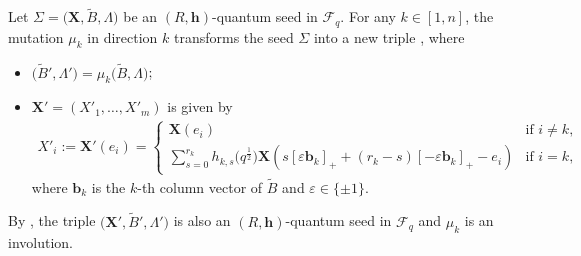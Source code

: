 \documentclass[pdftex]{sigma}
\numberwithin{equation}{section}
\begin{document}
 \begin{Definition}\label{mutation_of_generalzied_seed}
Let $\Sigma=\bigl(\mathbf{X},\tilde{B},\Lambda\bigr)$ be an $(R,\mathbf{h})$-quantum seed in $\mathcal{F}_q$. For any $k\in[1,n]$, the mutation $\mu_k$ in direction $k$ transforms the seed $\Sigma$ into a new triple , where
\begin{itemize}\itemsep=0pt
\item[(1)] $\bigl(\tilde{B}', \Lambda'\bigr)=\mu_{k}\bigl(\tilde{B},\Lambda\bigr)$;
\item[(2)] $\mathbf{X}'=(X'_1,\dots, X'_m)$ is given by
\begin{align*}
 X'_i:=\mathbf{X}'(e_i)=\begin{cases}
 \mathbf{X}(e_i)&\text{if }i\neq k,\\
 \displaystyle\sum\limits_{s=0}^{r_k}h_{k,s}\bigl(q^{\frac{1}{2}}\bigr)\mathbf{X}(s[\varepsilon \mathbf{b}_k]_{+}+(r_{k}-s)[-\varepsilon \mathbf{b}_k]_+-e_i)&\text{if }i=k,
 \end{cases}
\end{align*}
where $\mathbf{b}_k$ is the $k$-th column vector of $\tilde{B}$ and $\varepsilon\in\{\pm 1\}$.
\end{itemize}
\end{Definition}
By \cite[Propositions 3.6 and 3.7]{BCDX2018}, the triple $\bigl(\mathbf{X}',\tilde{B}',\Lambda'\bigr)$ is also an $(R,\mathbf{h})$-quantum seed in $\mathcal{F}_q$ and $\mu_{k}$ is an involution.
\end{document}
